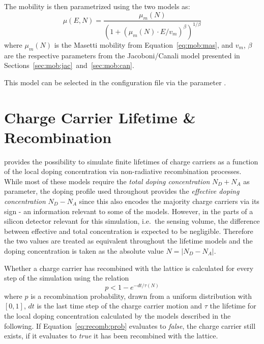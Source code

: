 The mobility is then parametrized using the two models as:
\begin{equation}
    \label{eq:mob:mascan}
    \mu (E, N) = \frac{\mu_{m}(N)}{\left(1 + \left(\mu_{m}(N) \cdot E / v_{m} \right)^{\beta} \right)^{1 / \beta}}
\end{equation}
where $\mu_{m}(N)$ is the Masetti mobility from Equation~\eqref{eq:mob:mas}, and $v_{m}$, $\beta$ are the respective parameters from the Jacoboni/Canali model presented in Sections~\ref{sec:mob:jac}~and~\ref{sec:mob:can}.

This model can be selected in the configuration file via the parameter .


\section{Charge Carrier Lifetime \& Recombination}
\label{sec:recombination}

\apsq provides the possibility to simulate finite lifetimes of charge carriers as a function of the local doping concentration via non-radiative recombination processes.
While most of these models require the \emph{total doping concentration} $N_D + N_A$ as parameter, the doping profile used throughout \apsq provides the \emph{effective doping concentration} $N_D - N_A$ since this also encodes the majority charge carriers via its sign - an information relevant to some of the models.
However, in the parts of a silicon detector relevant for this simulation, i.e.\ the sensing volume, the difference between effective and total concentration is expected to be negligible.
Therefore the two values are treated as equivalent throughout the lifetime models and the doping concentration is taken as the absolute value $N = \left|N_D - N_A\right|$.

Whether a charge carrier has recombined with the lattice is calculated for every step of the simulation using the relation
\begin{equation}
    \label{eq:recomb:prob}
    p < 1 - e^{- dt / \tau(N)}
\end{equation}
where $p$ is a recombination probability, drawn from a uniform distribution with $[0, 1]$, $dt$ is the last time step of the charge carrier motion and $\tau$ the lifetime for the local doping concentration calculated by the models described in the following.
If Equation~\eqref{eq:recomb:prob} evaluates to \emph{false}, the charge carrier still exists, if it evaluates to \emph{true} it has been recombined with the lattice.

